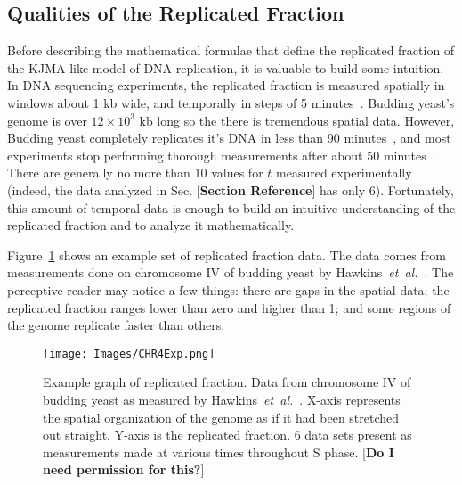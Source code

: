 	
		\subsection{Qualities of the Replicated Fraction}
		\label{subsec:QualitiesReplicatedFraction}
		
		Before describing the mathematical formulae that define the replicated fraction of the KJMA-like model of DNA replication, it is valuable to build some intuition.
		In DNA sequencing experiments, the replicated fraction is measured spatially in windows about 1 kb wide, and temporally in steps of 5 minutes~\cite{StochasticTermination}.
		Budding yeast's genome is over $12\times10^3$ kb long so the there is tremendous spatial data.
		However, Budding yeast completely replicates it's DNA in less than 90 minutes~\cite{DeepSeq}, and most experiments stop performing thorough measurements after about 50 minutes~\cite{StochasticTermination,DeepSeq,McCuneMicroArray}.
		There are generally no more than 10 values for $t$ measured experimentally (indeed, the data analyzed in Sec. [\textbf{Section Reference}] has only 6).
		Fortunately, this amount of temporal data is enough to build an intuitive understanding of the replicated fraction and to analyze it mathematically.
		
		Figure~\ref{fig:ReplicatedFractionExample} shows an example set of replicated fraction data.
		The data comes from measurements done on chromosome IV of budding yeast by Hawkins~\emph{et~al.}~\cite{StochasticTermination}.
		The perceptive reader may notice a few things:
		there are gaps in the spatial data;
		the replicated fraction ranges lower than zero and higher than 1;
		and some regions of the genome replicate faster than others.
		
		\begin{figure}[tbh]
			\begin{center}
				\texttt{[image: Images/CHR4Exp.png]}
			\end{center}
				\caption[Budding yeast chromosome IV replicated fraction]{\label{fig:ReplicatedFractionExample} Example graph of replicated fraction.
					Data from chromosome IV of budding yeast as measured by Hawkins~\emph{et~al.}~\cite{StochasticTermination}.	
					X-axis represents the spatial organization of the genome as if it had been stretched out straight.
					Y-axis is the replicated fraction.
					6 data sets present as measurements made at various times throughout S phase.
					[\textbf{Do I need permission for this?}]
				}
		\end{figure}
		
